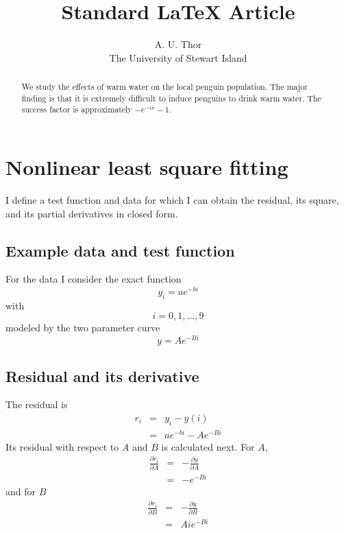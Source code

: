 \documentclass{article}
\begin{document}
\title{Standard 
\LaTeX{}
Article}
\author{A. U. Thor \\
The University of Stewart Island}
\maketitle

\begin{abstract}
We study the effects of warm water on the local penguin population. The
major finding is that it is extremely difficult to induce penguins to drink
warm water. The success factor is approximately $-e^{-i\pi }-1$.
\end{abstract}

\section{Nonlinear least square fitting}

I define a test function and data for which I can obtain the residual, its
square, and its partial derivatives in closed form.

\subsection{Example data and test function}

For the data I consider the exact function 
\begin{equation}
y_{i}=ae^{-bi}  \label{def:y_i}
\end{equation}%
with 
\begin{equation}
i=0,1,\ldots ,9  \label{def:i:0-9}
\end{equation}%
modeled by the two parameter curve%
\begin{equation}
y=Ae^{-Bi}  \label{def:y(i)}
\end{equation}

\subsection{Residual and its derivative}

The residual is%
\begin{eqnarray}
r_{i} &=&y_{i}-y\left( i\right) \\
&=&ae^{-bi}-Ae^{-Bi}  \label{eq:r_i^2}
\end{eqnarray}%
Its residual with respect to $A$ and $B$ is calculated next. For $A$,%
\begin{eqnarray}
\frac{\partial r_{i}}{\partial A} &=&-\frac{\partial y}{\partial A} \\
&=&-e^{-Bi}
\end{eqnarray}%
and for $B$%
\begin{eqnarray}
\frac{\partial r_{i}}{\partial B} &=&-\frac{\partial y}{\partial B} \\
&=&Aie^{-Bi}
\end{eqnarray}
\end{document}
